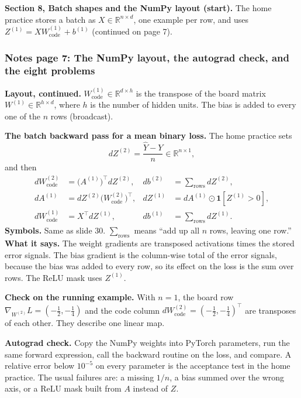 \textbf{Section 8, Batch shapes and the NumPy layout (start).} The home practice stores a batch as $X\in\mathbb{R}^{n\times d}$, one example per row, and uses $Z^{(1)}=XW^{(1)}_{\text{code}}+b^{(1)}$ (continued on page 7).

\subsubsection{Notes page 7: The NumPy layout, the autograd check, and the eight problems}

\textbf{Layout, continued.} $W^{(1)}_{\text{code}}\in\mathbb{R}^{d\times h}$ is the transpose of the board matrix $W^{(1)}\in\mathbb{R}^{h\times d}$, where $h$ is the number of hidden units. The bias is added to every one of the $n$ rows (broadcast).

\textbf{The batch backward pass for a mean binary loss.} The home practice sets
\[
dZ^{(2)}=\frac{\hat{Y}-Y}{n}\in\mathbb{R}^{n\times1},
\]
and then
\[
\begin{aligned}
dW^{(2)}_{\text{code}}&=\big(A^{(1)}\big)^\top dZ^{(2)}, & db^{(2)}&=\sum_{\text{rows}}dZ^{(2)},\\
dA^{(1)}&=dZ^{(2)}\big(W^{(2)}_{\text{code}}\big)^\top, & dZ^{(1)}&=dA^{(1)}\odot\mathbf{1}[Z^{(1)}>0],\\
dW^{(1)}_{\text{code}}&=X^\top dZ^{(1)}, & db^{(1)}&=\sum_{\text{rows}}dZ^{(1)}.
\end{aligned}
\]
\textbf{Symbols.} Same as slide 30. $\sum_{\text{rows}}$ means ``add up all $n$ rows, leaving one row.'' \textbf{What it says.} The weight gradients are transposed activations times the stored error signals. The bias gradient is the column-wise total of the error signals, because the bias was added to every row, so its effect on the loss is the sum over rows. The ReLU mask uses $Z^{(1)}$.

\textbf{Check on the running example.} With $n=1$, the board row $\nabla_{W^{(2)}}L=(-\tfrac12,-\tfrac14)$ and the code column $dW^{(2)}_{\text{code}}=(-\tfrac12,-\tfrac14)^\top$ are transposes of each other. They describe one linear map.

\textbf{Autograd check.} Copy the NumPy weights into PyTorch parameters, run the same forward expression, call the backward routine on the loss, and compare. A relative error below $10^{-5}$ on every parameter is the acceptance test in the home practice. The usual failures are: a missing $1/n$, a bias summed over the wrong axis, or a ReLU mask built from $A$ instead of $Z$.

